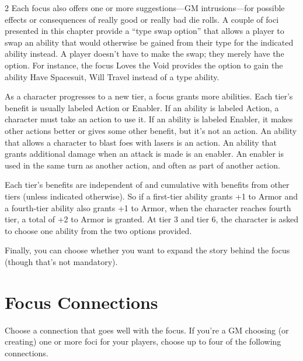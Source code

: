 \begin{multicols}{2}
Each focus also offers one or more suggestions—GM intrusions—for possible effects or consequences of really good or really bad die rolls.
A couple of foci presented in this chapter provide a “type swap option” that allows a player to swap an ability that would otherwise be gained from their type for the indicated ability instead. A player doesn’t have to make the swap; they merely have the option. For instance, the focus Loves the Void provides the option to gain the ability Have Spacesuit, Will Travel instead of a type ability.

As a character progresses to a new tier, a focus grants more abilities. Each tier’s benefit is usually labeled Action or Enabler. If an ability is labeled Action, a character must take an action to use it. If an ability is labeled Enabler, it makes other actions better or gives some other benefit, but it’s not an action. An ability that allows a character to blast foes with lasers is an action. An ability that grants additional damage when an attack is made is an enabler. An enabler is used in the same turn as another action, and often as part of another action.

Each tier’s benefits are independent of and cumulative with benefits from other tiers (unless indicated otherwise). So if a first-tier ability grants +1 to Armor and a fourth-tier ability also grants +1 to Armor, when the character reaches fourth tier, a total of +2 to Armor is granted.
At tier 3 and tier 6, the character is asked to choose one ability from the two options provided.

Finally, you can choose whether you want to expand the story behind the focus (though that’s not mandatory).

\section{Focus Connections}

Choose a connection that goes well with the focus. If you’re a GM choosing (or creating) one or more foci for your players, choose up to four of the following connections. 


\end{multicols}
